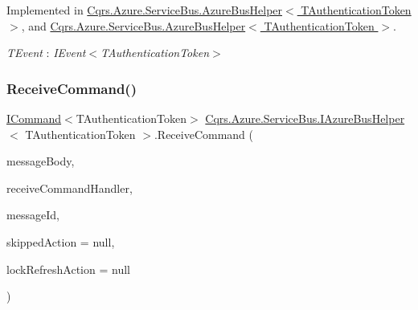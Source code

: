 Implemented in \hyperlink{classCqrs_1_1Azure_1_1ServiceBus_1_1AzureBusHelper_afb3ade39a8f8fd39c871c687701d80f4}{Cqrs.\+Azure.\+Service\+Bus.\+Azure\+Bus\+Helper$<$ T\+Authentication\+Token $>$}, and \hyperlink{classCqrs_1_1Azure_1_1ServiceBus_1_1AzureBusHelper_afb3ade39a8f8fd39c871c687701d80f4}{Cqrs.\+Azure.\+Service\+Bus.\+Azure\+Bus\+Helper$<$ T\+Authentication\+Token $>$}.

\begin{Desc}
\item[Type Constraints]\begin{description}
\item[{\em T\+Event} : {\em I\+Event$<$T\+Authentication\+Token$>$}]\end{description}
\end{Desc}
\mbox{\label{interfaceCqrs_1_1Azure_1_1ServiceBus_1_1IAzureBusHelper_a16dd52eec62dd41df564bb25467b710d}} 
\subsubsection{\texorpdfstring{Receive\+Command()}{ReceiveCommand()}}
{\footnotesize\ttfamily \hyperlink{interfaceCqrs_1_1Commands_1_1ICommand}{I\+Command}$<$T\+Authentication\+Token$>$ \hyperlink{interfaceCqrs_1_1Azure_1_1ServiceBus_1_1IAzureBusHelper}{Cqrs.\+Azure.\+Service\+Bus.\+I\+Azure\+Bus\+Helper}$<$ T\+Authentication\+Token $>$.Receive\+Command (\begin{DoxyParamCaption}\item[{string}]{message\+Body,  }\item[{Func$<$ \hyperlink{interfaceCqrs_1_1Commands_1_1ICommand}{I\+Command}$<$ T\+Authentication\+Token $>$, bool?$>$}]{receive\+Command\+Handler,  }\item[{string}]{message\+Id,  }\item[{Action}]{skipped\+Action = {\ttfamily null},  }\item[{Action}]{lock\+Refresh\+Action = {\ttfamily null} }\end{DoxyParamCaption})}



